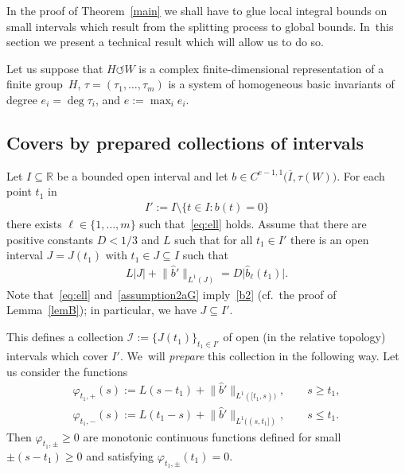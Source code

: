 \documentclass[pdftex]{sigma}
\numberwithin{equation}{section}
\def\ta{\tau}
\def\vh{\varphi}
\def\R{\mathbb{R}}
\def\cI{\mathcal{I}}
\def\we{\hat}
\def\acts{\circlearrowleft}
\begin{document}
In the proof of Theorem~\ref{main} we shall have to glue local integral bounds on small intervals which result from the splitting
process to global bounds. In~this section we present a technical result which will
allow us to do so.

Let us suppose that $H \acts W$ is a complex finite-dimensional representation of a finite group~$H$,
$\ta= (\ta_1,\dots, \ta_m)$ is a system of homogeneous basic invariants of degree $e_i = \deg \ta_i$, and
$e := \max_i e_i$.



\subsection{Covers by prepared collections of intervals}\label{sec:preparation}
Let $I \subseteq \R$ be a bounded open interval and
let $b \in C^{e-1,1}\big(\overline I,\ta(W)\big)$.
For each point $t_1$ in
\begin{gather*}
 I' := I \setminus \{t \in I \colon b (t) = 0\}
\end{gather*}
there exists $\ell \in \{1, \dots, m\}$ such that~\eqref{eq:ell} holds.
Assume that there are positive constants $D < 1/3$ and $L$ such that
for all $t_1 \in I'$
there is
an open interval $J=J(t_1)$ with $t_1 \in J \subseteq I$ such that
\begin{gather} \label{assumption2aG}
 L | J| + \big\|\we b'\big\|_{L^1 (J)} = D\big |\we b_\ell(t_1)\big|.
\end{gather}
Note that~\eqref{eq:ell} and~\eqref{assumption2aG} imply~\eqref{b2} (cf.\ the proof of Lemma~\ref{lemB});
in particular, we have $J \subseteq I'$.

This defines a collection $\cI:=\{J(t_1)\}_{t_1\in I'}$ of open (in the relative topology) intervals which cover $I'$. We~will \emph{prepare} this collection in the following way.
Let us consider the functions
\begin{gather*}
 \vh_{t_1,+}(s) := L (s-t_1) + \big\|\we b'\big\|_{L^1 ([t_1,s))}, \qquad s\ge t_1,
 \\
 \vh_{t_1,-}(s) := L (t_1-s) + \big\|\we b'\big\|_{L^1 ((s,t_1])}, \qquad s\le t_1.
\end{gather*}
Then $\vh_{t_1,\pm} \ge 0$ are monotonic continuous functions defined for small $\pm (s - t_1)\ge 0$
and satisfying $\vh_{t_1,\pm}(t_1) = 0$.
\end{document}
